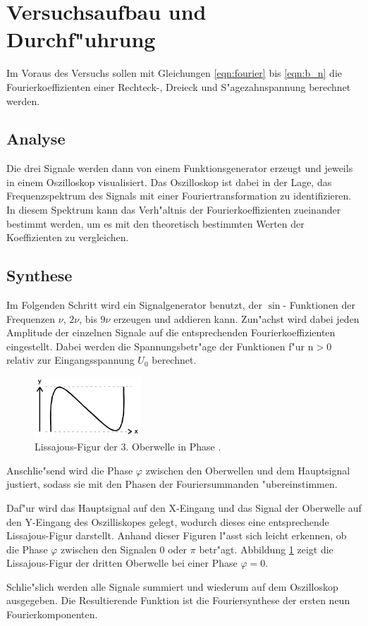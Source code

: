 \section{Versuchsaufbau und Durchf"uhrung} %
\label{sec:durchf_uhrung}
	Im Voraus des Versuchs sollen mit Gleichungen \eqref{eqn:fourier} bis \eqref{eqn:b_n} die Fourierkoeffizienten einer Rechteck-, Dreieck und S"agezahnspannung berechnet werden.

	\subsection{Analyse}
	\label{subsec:analyse}
		Die drei Signale werden dann von einem Funktionsgenerator erzeugt und jeweils in einem Oszilloskop visualisiert.
		Das Oszilloskop ist dabei in der Lage, das Frequenzspektrum des Signals mit einer Fouriertransformation zu identifizieren.
		In diesem Spektrum kann das Verh"altnis der Fourierkoeffizienten zueinander bestimmt werden, um es mit den theoretisch bestimmten Werten der Koeffizienten zu vergleichen.

	\subsection{Synthese}
	\label{subsec:synthese}
		Im Folgenden Schritt wird ein Signalgenerator benutzt, der $\sin$- Funktionen der Frequenzen $\nu$, $2\nu$, bis $9\nu$ erzeugen und addieren kann.
		Zun"achst wird dabei jeden Amplitude der einzelnen Signale auf die entsprechenden Fourierkoeffizienten eingestellt.
		Dabei werden die Spannungsbetr"age der Funktionen f"ur $\mathrm{n} > 0$ relativ zur Eingangsspannung $U_0$ berechnet.

		\clearpage

		\begin{figure}
			\centering
			\includegraphics[width = 4cm]{img/lissajous.jpeg}
			\captionsetup{format=plain}
			\caption{Lissajous-Figur der 3. Oberwelle in Phase \cite{anleitung}.}
			\label{fig:lissajous}
		\end{figure}

		Anschlie"send wird die Phase $\varphi$ zwischen den Oberwellen und dem Hauptsignal justiert, sodass sie mit den Phasen der Fouriersummanden "ubereinstimmen.

		Daf"ur wird das Hauptsignal auf den X-Eingang und das Signal der Oberwelle auf den Y-Eingang des Oszilliskopes gelegt, wodurch dieses eine entsprechende Lissajous-Figur darstellt.
		Anhand dieser Figuren l"asst sich leicht erkennen, ob die Phase $\varphi$ zwischen den Signalen 0 oder $\pi$ betr"agt.
		Abbildung \ref{fig:lissajous} zeigt die Lissajous-Figur der dritten Oberwelle bei einer Phase $\varphi = 0$.

		Schlie"slich werden alle Signale summiert und wiederum auf dem Oszilloskop ausgegeben.
		Die Resultierende Funktion ist die Fouriersynthese der ersten neun Fourierkomponenten.